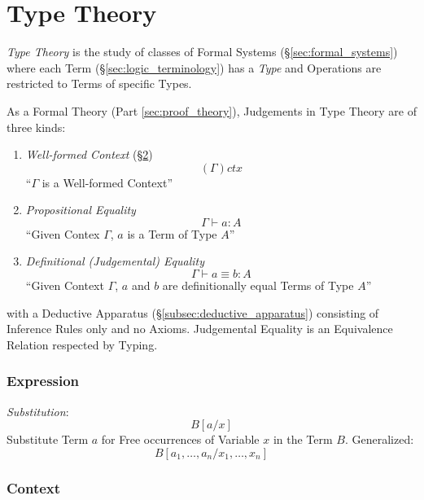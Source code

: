 \documentclass{article}
\begin{document}
\part{Type Theory}\label{sec:type_theory}

\emph{Type Theory} is the study of classes of Formal Systems
(\S\ref{sec:formal_systems}) where each Term
(\S\ref{sec:logic_terminology}) has a \emph{Type} and Operations
are restricted to Terms of specific Types.

As a Formal Theory (Part \ref{sec:proof_theory}), Judgements in Type
Theory are of three kinds\cite{hott13}:
\begin{enumerate}

\item \emph{Well-formed Context} (\S\ref{sec:type_context})
\[
    (\Gamma) ctx
\]
``$\Gamma$ is a Well-formed Context''

\item \emph{Propositional Equality}
\[
    \Gamma \vdash a : A
\]
``Given Contex $\Gamma$, $a$ is a Term of Type $A$''

\item \emph{Definitional (Judgemental) Equality}
\[
    \Gamma \vdash a \equiv b : A
\]
``Given Context $\Gamma$, $a$ and $b$ are definitionally equal Terms
of Type $A$''

\end{enumerate}
with a Deductive Apparatus (\S\ref{subsec:deductive_apparatus})
consisting of Inference Rules only and no Axioms. Judgemental Equality
is an Equivalence Relation respected by Typing.



\section{Expression}\label{sec:type_expression}

\emph{Substitution}:
\[
    B[a/x]
\]
Substitute Term $a$ for Free occurrences of Variable $x$ in the Term
$B$. Generalized:
\[
    B[a_1,\ldots,a_n / x_1,\ldots,x_n]
\]



\section{Context}\label{sec:type_context}
\end{document}

